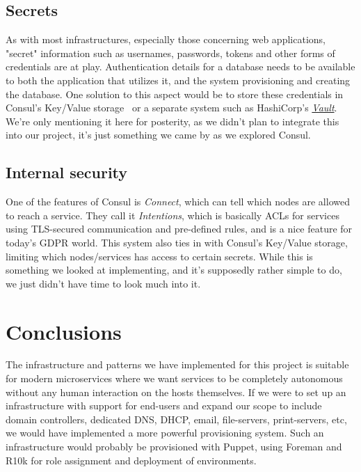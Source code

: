         \subsection{Secrets}
            As with most infrastructures, especially those concerning web applications, "secret" information such as usernames, passwords, tokens and other forms of credentials are at play. Authentication details for a database needs to be available to both the application that utilizes it, and the system provisioning and creating the database. One solution to this aspect would be to store these credentials in Consul's Key/Value storage~\cite{Consul:KV} or a separate system such as HashiCorp's \href{https://www.hashicorp.com/products/vault/}{\textit{Vault}}.\\
            We're only mentioning it here for posterity, as we didn't plan to integrate this into our project, it's just something we came by as we explored Consul.
        
        \subsection{Internal security}
            One of the features of Consul is \textit{Connect}, which can tell which nodes are allowed to reach a service. They call it \textit{Intentions}, which is basically ACLs for services using TLS-secured communication and pre-defined rules, and is a nice feature for today's GDPR world. This system also ties in with Consul's Key/Value storage, limiting which nodes/services has access to certain secrets. While this is something we looked at implementing, and it's supposedly rather simple to do, we just didn't have time to look much into it.
            
    \section{Conclusions}
        The infrastructure and patterns we have implemented for this project is suitable for modern microservices where we want services to be completely autonomous without any human interaction on the hosts themselves. If we were to set up an infrastructure with support for end-users and expand our scope to include domain controllers, dedicated DNS, DHCP, email, file-servers, print-servers, etc, we would have implemented a more powerful provisioning system. Such an infrastructure would probably be provisioned with Puppet, using Foreman and R10k for role assignment and deployment of environments.\\
        
